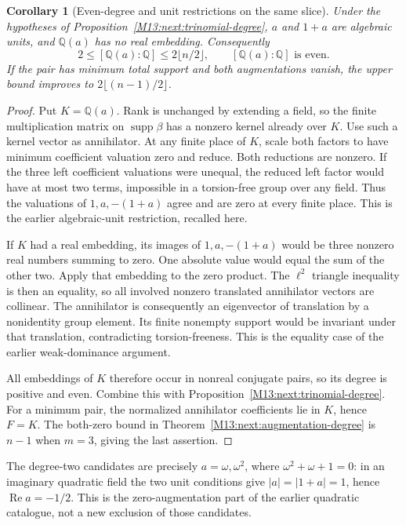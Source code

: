 \documentclass[11pt,a4paper,oneside]{report}
\newtheorem{corollary}[theorem]{Corollary}
\theoremstyle{definition}
\theoremstyle{remark}
\DeclareMathOperator{\supp}{supp}
\newcommand{\Q}{\mathbb Q}
\begin{document}
\begin{corollary}[Even-degree and unit restrictions on the same slice]
\label{M13:next:trinomial-even-degree}
Under the hypotheses of Proposition~\ref{M13:next:trinomial-degree},
$a$ and $1+a$ are algebraic units, and $\Q(a)$ has no real
embedding. Consequently
\[
 2\le [\Q(a):\Q]\le 2\lfloor n/2\rfloor,
 \qquad [\Q(a):\Q]\text{ is even}.
\]
If the pair has minimum total support and both augmentations
vanish, the upper bound improves to
$2\lfloor(n-1)/2\rfloor$.
\end{corollary}
\begin{proof}
Put $K=\Q(a)$. Rank is unchanged by extending a field, so the
finite multiplication matrix on $\supp\beta$ has a nonzero
kernel already over $K$. Use such a kernel vector as annihilator.
At any finite place of $K$, scale both factors to have minimum
coefficient valuation zero and reduce. Both reductions are
nonzero. If the three left coefficient valuations were unequal,
the reduced left factor would have at most two terms, impossible
in a torsion-free group over any field. Thus the valuations of
$1,a,-(1+a)$ agree and are zero at every finite place. This is
the earlier algebraic-unit restriction, recalled here.

If $K$ had a real embedding, its images of $1,a,-(1+a)$ would be
three nonzero real numbers summing to zero. One absolute value
would equal the sum of the other two. Apply that embedding to
the zero product. The $\ell^2$ triangle inequality is then an
equality, so all involved nonzero translated annihilator vectors
are collinear. The annihilator is consequently an eigenvector
of translation by a nonidentity group element. Its finite
nonempty support would be invariant under that translation,
contradicting torsion-freeness. This is the equality case of the
earlier weak-dominance argument.

All embeddings of $K$ therefore occur in nonreal conjugate pairs,
so its degree is positive and even. Combine this with
Proposition~\ref{M13:next:trinomial-degree}. For a minimum pair, the
normalized annihilator coefficients lie in $K$, hence $F=K$.
The both-zero bound in Theorem~\ref{M13:next:augmentation-degree}
is $n-1$ when $m=3$, giving the last assertion.
\end{proof}

The degree-two candidates are precisely $a=\omega,\omega^2$,
where $\omega^2+\omega+1=0$: in an imaginary quadratic field
the two unit conditions give $|a|=|1+a|=1$, hence
$\operatorname{Re}a=-1/2$. This is the zero-augmentation part
of the earlier quadratic catalogue, not a new exclusion of
those candidates.
\end{document}
